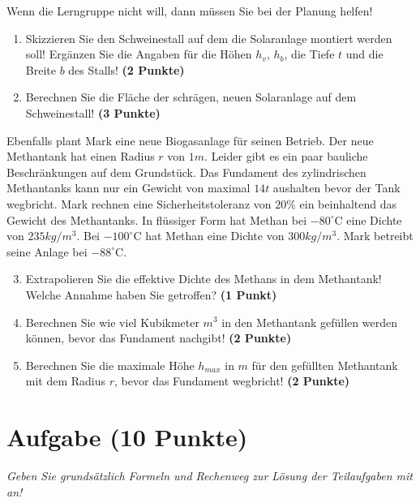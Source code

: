 \documentclass[a4paper, 9pt]{scrartcl}\usepackage[]{graphicx}\usepackage[]{xcolor}
\begin{document}
\vspace{1Ex}

Wenn die Lerngruppe nicht will, dann müssen Sie bei der Planung helfen!

\begin{enumerate}
\item Skizzieren Sie den Schweinestall auf dem die Solaranlage montiert werden soll! Ergänzen Sie die Angaben für die Höhen $h_v$, $h_b$, die Tiefe $t$ und die Breite $b$ des Stalls!  \textbf{(2 Punkte)}
\item Berechnen Sie die Fläche der schrägen, neuen Solaranlage auf dem Schweinestall! \textbf{(3 Punkte)}
\end{enumerate}

Ebenfalls plant Mark eine neue Biogasanlage für seinen Betrieb. Der neue Methantank hat einen Radius $r$ von $1m$. Leider gibt es ein paar bauliche Beschränkungen auf dem Grundstück. Das Fundament des zylindrischen Methantanks kann nur ein Gewicht von maximal $14t$ aushalten bevor der Tank wegbricht. Mark rechnen eine Sicherheitstoleranz von $20\%$ ein beinhaltend das Gewicht des Methantanks. In flüssiger Form hat Methan bei $-80^\circ\text{C}$ eine Dichte von $235kg/m^3$. Bei $-100^\circ\text{C}$ hat Methan eine Dichte von $300kg/m^3$. Mark betreibt seine Anlage bei $-88^\circ\text{C}$.

\begin{enumerate}
  \setcounter{enumi}{2}
\item Extrapolieren Sie die effektive Dichte des Methans in dem Methantank! Welche Annahme haben Sie getroffen? \textbf{(1 Punkt)}
\item Berechnen Sie wie viel Kubikmeter $m^3$ in den Methantank gefüllen werden können, bevor das Fundament nachgibt! \textbf{(2 Punkte)}
\item Berechnen Sie die maximale Höhe $h_{max}$ in $m$ für den gefüllten Methantank mit dem Radius $r$, bevor das Fundament wegbricht! \textbf{(2 Punkte)}
\end{enumerate}

 
\clearpage

\section{Aufgabe \hfill (10 Punkte)}

\textit{Geben Sie grundsätzlich Formeln und Rechenweg zur Lösung der Teilaufgaben mit an!} \\[1Ex]
 
\end{document}
